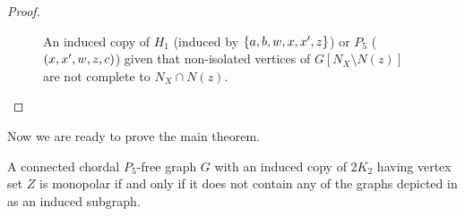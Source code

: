 \begin{proof}
\begin{enumerate}[label=(\roman*)]
\begin{figure}[htb!]
                \caption{An induced copy of $H_1$ (induced by
                    $\left\{a,b,w,x,x',z\right\}$) or $P_5$ ($\left(x,x',w,z,c\right)$) given that
                    non-isolated vertices of $G[N_X\setminus N(z)]$ are not
                    complete to $N_X\cap N(z)$.}
                \label{fig:chordal_comp_2}
            \end{figure}
    \end{enumerate}
\end{proof}

Now we are ready to prove the main theorem.

\begin{theorem}
    \label{thm:monopolar_chordal}
    A connected chordal $P_5$-free graph $G$ with an induced copy of $2K_2$
    having vertex set $Z$ is monopolar if and only if it does not contain any of
    the graphs depicted in  as an induced
    subgraph.
\end{theorem}

